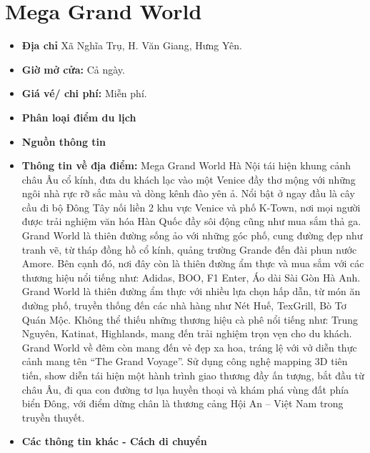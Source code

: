 \documentclass{article}
\begin{document}
\section{Mega Grand World}
\begin{itemize}
    \item{\textbf{Địa chỉ}} Xã Nghĩa Trụ, H. Văn Giang, Hưng Yên.

    \item{\textbf{Giờ mở cửa:}} Cả ngày.

    \item{\textbf{Giá vé/ chi phí:}} Miễn phí.

    \item{\textbf{Phân loại điểm du lịch}} 

    \item{\textbf{Nguồn thông tin}} 

    \item{\textbf{Thông tin về địa điểm:}} Mega Grand World Hà Nội tái hiện khung cảnh châu Âu cổ kính, đưa du khách lạc vào một Venice đầy thơ mộng với những ngôi nhà rực rỡ sắc màu và dòng kênh đào yên ả. Nổi bật ở ngay đầu là cây cầu đi bộ Đông Tây nối liền 2 khu vực Venice và phố K-Town, nơi mọi người được trải nghiệm văn hóa Hàn Quốc đầy sôi động cũng như mua sắm thả ga. Grand World là thiên đường sống ảo với những góc phố, cung đường đẹp như tranh vẽ, từ tháp đồng hồ cổ kính, quảng trường Grande đến đài phun nước Amore. Bên cạnh đó, nơi đây còn là thiên đường ẩm thực và mua sắm với các thương hiệu nổi tiếng như: Adidas, BOO, F1 Enter, Áo dài Sài Gòn Hà Anh. Grand World là thiên đường ẩm thực với nhiều lựa chọn hấp dẫn, từ món ăn đường phố, truyền thống đến các nhà hàng như Nét Huế, TexGrill, Bò Tơ Quán Mộc. Không thể thiếu những thương hiệu cà phê nổi tiếng như: Trung Nguyên, Katinat, Highlands, mang đến trải nghiệm trọn vẹn cho du khách. Grand World về đêm còn mang đến vẻ đẹp xa hoa, tráng lệ với vở diễn thực cảnh mang tên “The Grand Voyage”. Sử dụng công nghệ mapping 3D tiên tiến, show diễn tái hiện một hành trình giao thương đầy ấn tượng, bắt đầu từ châu Âu, đi qua con đường tơ lụa huyền thoại và khám phá vùng đất phía biển Đông, với điểm dừng chân là thương cảng Hội An – Việt Nam trong truyền thuyết.
\end{itemize}

\begin{itemize}
    \item{\textbf{Các thông tin khác - Cách di chuyển}} 
\end{itemize}
\end{document}
